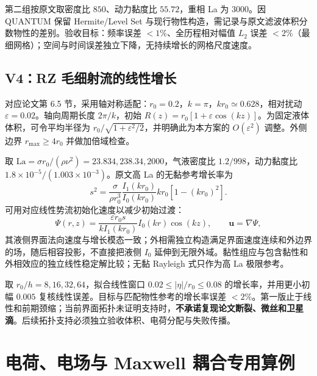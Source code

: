 \documentclass[UTF8,a4paper,11pt,fontset=fandol]{ctexart}
\numberwithin{equation}{section}
\newcommand{\uu}{\bm u}\newcommand{\UU}{\bm U}\newcommand{\FF}{\bm F}
\begin{document}
第二组按原文取密度比 $850$、动力黏度比 $55.72$，重相 La 为 $3000$。因 QUANTUM 保留 Hermite/Level Set 与现行物性构造，需记录与原文滤波体积分数物性的差别。验收目标：频率误差 $<1\%$、全历程相对幅值 $L_2$ 误差 $<2\%$（最细网格）；空间与时间误差独立下降，无持续增长的网格尺度速度。

\subsection{V4：RZ 毛细射流的线性增长}
对应论文第 6.5 节，采用轴对称适配：$r_0=0.2$，$k=\pi$，$kr_0\simeq0.628$，相对扰动 $\varepsilon=0.02$。轴向周期长度 $2\pi/k$，初始 $R(z)=r_0[1+\varepsilon\cos(kz)]$。为固定液体体积，可令平均半径为 $r_0/\sqrt{1+\varepsilon^2/2}$，并明确此为本方案的 $O(\varepsilon^2)$ 调整。外侧边界 $r_{\max}\ge4r_0$ 并做加倍域检查。

取 $\mathrm{La}=\sigma r_0/(\rho\nu^2)=23.834,238.34,2000$，气液密度比 $1.2/998$，动力黏度比 $1.8\times10^{-5}/(1.003\times10^{-3})$。原文高 La 的无黏参考增长率为
\begin{equation}
 s^2=\frac{\sigma}{\rho r_0^3}\frac{I_1(kr_0)}{I_0(kr_0)}kr_0[1-(kr_0)^2].
\end{equation}
可用对应线性势流初始化速度以减少初始过渡：
\begin{equation}
 \Psi(r,z)=\frac{\varepsilon r_0s}{kI_1(kr_0)}I_0(kr)\cos(kz),\qquad\uu=\nabla\Psi,
\end{equation}
其液侧界面法向速度与增长模态一致；外相需独立构造满足界面速度连续和外边界的场，随后相容投影，不直接把液侧 $I_0$ 延伸到无限外域。黏性组应与包含黏性和外相效应的独立线性稳定解比较；无黏 Rayleigh 式只作为高 La 极限参考。

取 $r_0/h=8,16,32,64$，拟合线性窗口 $0.02\le |\eta|/r_0\le0.08$ 的增长率，并用更小初幅 $0.005$ 复核线性误差。目标与匹配物性参考的增长率误差 $<2\%$。第一版止于线性和前期颈缩；当前界面拓扑未证明支持时，\textbf{不承诺复现论文断裂、微丝和卫星滴}。后续拓扑支持必须独立验收体积、电荷分配与失败传播。

\section{电荷、电场与 Maxwell 耦合专用算例}
\end{document}

